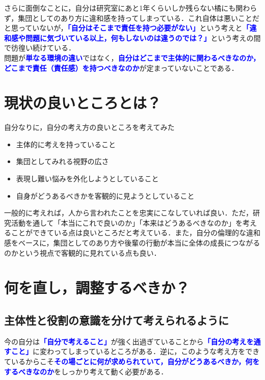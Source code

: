 \documentclass[a4paper,12pt]{ltjsarticle}
\newcommand{\important}[1]{\textcolor{blue}{\textbf{#1}}}
\begin{document}
さらに面倒なことに，自分は研究室にあと1年くらいしか残らない橘にも関わらず，集団としてのあり方に違和感を持ってしまっている．これ自体は悪いことだと思っていないが，\important{「自分はそこまで責任を持つ必要がない」}という考えと\important{「違和感や問題に気づいている以上，何もしないのは違うのでは？」}という考えの間で彷徨い続けている．\\

問題が\important{単なる環境の違い}ではなく，\important{自分はどこまで主体的に関わるべきなのか，どこまで責任（責任感）を持つべきなのか}が定まっていないことである．
\newpage

\section{現状の良いところとは？}

自分なりに，自分の考え方の良いところを考えてみた

\begin{itemize}
  \item 主体的に考えを持っていること
  \item 集団としてみれる視野の広さ
  \item 表現し難い悩みを外化しようとしていること
  \item 自身がどうあるべきかを客観的に見ようとしていること
\end{itemize}

一般的に考えれば，人から言われたことを忠実にこなしていれば良い．ただ，研究活動を通して「本当にこれで良いのか」「本来はどうあるべきなのか」を考えることができている点は良いところだと考えている．また，自分の倫理的な違和感をベースに，集団としてのあり方や後輩の行動が本当に全体の成長につながるのかという視点で客観的に見れている点も良い．
\newpage

\section{何を直し，調整するべきか？}

\subsection{主体性と役割の意識を分けて考えられるように}

今の自分は\important{「自分で考えること」}が強く出過ぎていることから\important{「自分の考えを通すこと」}に変わってしまっているところがある．逆に，このような考え方をできているからこそ\important{その場ごとに何が求められていて，自分がどうあるべきか，何をするべきなのか}をしっかり考えて動く必要がある．\\
\end{document}
